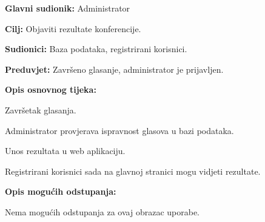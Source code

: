					\noindent {}
					\begin{packed_item}
						
						\item \textbf{Glavni sudionik: }Administrator
						\item  \textbf{Cilj:} Objaviti rezultate konferencije.
						\item  \textbf{Sudionici:} Baza podataka, registrirani korisnici.
						\item  \textbf{Preduvjet:} Završeno glasanje, administrator je prijavljen.
						\item  \textbf{Opis osnovnog tijeka:}
						
						\item[] \begin{packed_enum}
							
							\item Završetak glasanja.
							\item Administrator provjerava ispravnost glasova u bazi podataka.
							\item Unos rezultata u web aplikaciju.
							\item Registrirani korisnici sada na glavnoj stranici mogu vidjeti rezultate.
						\end{packed_enum}
						
						\item  \textbf{Opis mogućih odstupanja:}
						
						\item[] \begin{packed_item}
							
							\item Nema mogućih odstupanja za ovaj obrazac uporabe.
							
						\end{packed_item}
					\end{packed_item}
					
